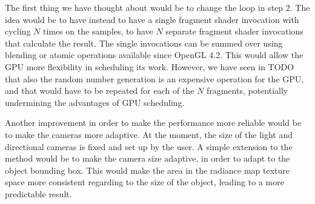 The first thing we have thought about would be to change the loop in step 2. The idea would be to have instead to have a single fragment shader invocation with cycling $N$ times on the samples, to have $N$ separate fragment shader invocations that calculate the result. The single invocations can be summed over using blending or atomic operations available since OpenGL 4.2. This would allow the GPU more flexibility in scheduling its work. However, we have seen in TODO that also the random number generation is an expensive operation for the GPU, and that would have to be repeated for each of the $N$ fragments, potentially undermining the advantages of GPU scheduling. 

Another improvement in order to make the performance more reliable would be to make the cameras more adaptive. At the moment, the size of the light and directional cameras is fixed and set up by the user. A simple extension to the method would be to make the camera size adaptive, in order to adapt to the object bounding box. This would make the area in the radiance map texture space more consistent regarding to the size of the object, leading to a more predictable result. 

